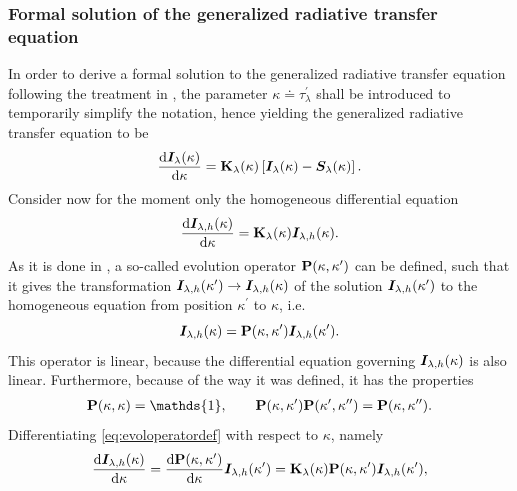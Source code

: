 \documentclass[a4paper,12pt]{report}
\begin{document}
\subsubsection{Formal solution of the generalized radiative transfer equation}
In order to derive a formal solution to the generalized radiative transfer equation following the treatment in \cite[pp.152-157]{delToroIniesta.2003}, the parameter $\kappa \doteq \tau_\lambda^\prime$ shall be introduced to temporarily simplify the notation, hence yielding the generalized radiative transfer equation to be \begin{equation}\label{eq:generalizedradtransferkappa}
\frac{\mathrm{d}\bm{I}_\lambda(\kappa)}{\mathrm{d}\kappa} = \boldsymbol{\mathbf{K}}_\lambda(\kappa)\left[\bm{I}_\lambda(\kappa)-\bm{S}_\lambda(\kappa)\right].
\end{equation} Consider now for the moment only the homogeneous differential equation \begin{equation}\label{eq:homogeneralizedradeq}
\frac{\mathrm{d}\bm{I}_{\lambda,h}(\kappa)}{\mathrm{d}\kappa} = \boldsymbol{\mathbf{K}}_\lambda(\kappa)\bm{I}_{\lambda,h}(\kappa).
\end{equation} As it is done in \cite[p.152]{delToroIniesta.2003}, a so-called evolution operator $\boldsymbol{\mathbf{P}}(\kappa, \kappa^\prime)$ can be defined, such that it gives the transformation $\bm{I}_{\lambda,h}(\kappa^\prime)\rightarrow \bm{I}_{\lambda,h}(\kappa)$ of the solution $\bm{I}_{\lambda,h}(\kappa^\prime)$ to the homogeneous equation from position $\kappa^\prime$ to $\kappa$, i.e. \begin{equation}\label{eq:evoloperatordef}
\bm{I}_{\lambda,h}(\kappa) = \boldsymbol{\mathbf{P}}(\kappa,\kappa^\prime)\bm{I}_{\lambda,h}(\kappa^\prime).
\end{equation} This operator is linear, because the differential equation governing $\bm{I}_{\lambda,h}(\kappa)$ is also linear. Furthermore, because of the way it was defined, it has the properties \begin{gather}
\matr{P}(\kappa,\kappa) = \mathds{1}, \qquad \matr{P}(\kappa,\kappa^\prime)\matr{P}(\kappa^\prime, \kappa^{\prime\prime}) = \matr{P}(\kappa,\kappa^{\prime\prime}). 
\end{gather} Differentiating \cref{eq:evoloperatordef} with respect to $\kappa$, namely \begin{align}
\begin{aligned}
\frac{\mathrm{d}\vect{I}_{\lambda,h}(\kappa)}{\mathrm{d}\kappa} = \frac{\mathrm{d}\matr{P}(\kappa,\kappa^\prime)}{\mathrm{d}\kappa}\vect{I}_{\lambda,h}(\kappa^\prime) = \matr{K}_\lambda(\kappa)\matr{P}(\kappa,\kappa^\prime)\vect{I}_{\lambda,h}(\kappa^\prime),

\end{aligned}
\end{align}
\end{document}
